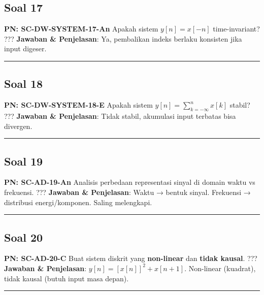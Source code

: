 \documentclass[
  letterpaper,
  DIV=11,
  numbers=noendperiod]{scrreprt}
\begin{document}
\subsection{Soal 17}\label{soal-17}

\textbf{PN: SC-DW-SYSTEM-17-An} Apakah sistem \(y[n]=x[-n]\)
time-invariant? ??? \textbf{Jawaban \& Penjelasan}: Ya, pembalikan
indeks berlaku konsisten jika input digeser.

\begin{center}\rule{0.5\linewidth}{0.5pt}\end{center}

\subsection{Soal 18}\label{soal-18}

\textbf{PN: SC-DW-SYSTEM-18-E} Apakah sistem
\(y[n]=\sum_{k=-\infty}^n x[k]\) stabil? ??? \textbf{Jawaban \&
Penjelasan}: Tidak stabil, akumulasi input terbatas bisa divergen.

\begin{center}\rule{0.5\linewidth}{0.5pt}\end{center}

\subsection{Soal 19}\label{soal-19}

\textbf{PN: SC-AD-19-An} Analisis perbedaan representasi sinyal di
domain waktu vs frekuensi. ??? \textbf{Jawaban \& Penjelasan}: Waktu →
bentuk sinyal. Frekuensi → distribusi energi/komponen. Saling
melengkapi.

\begin{center}\rule{0.5\linewidth}{0.5pt}\end{center}

\subsection{Soal 20}\label{soal-20}

\textbf{PN: SC-AD-20-C} Buat sistem diskrit yang \textbf{non-linear} dan
\textbf{tidak kausal}. ??? \textbf{Jawaban \& Penjelasan}:
\(y[n]=[x[n]]^2 + x[n+1]\). Non-linear (kuadrat), tidak kausal (butuh
input masa depan).

\begin{center}\rule{0.5\linewidth}{0.5pt}\end{center}

\end{document}
